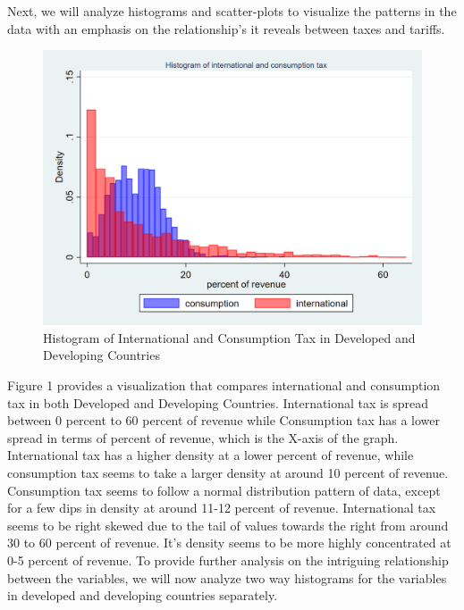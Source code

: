 \documentclass[12pt]{article}
\begin{document}
Next, we will analyze histograms and scatter-plots to visualize the patterns in the data with an emphasis on the relationship's it reveals between taxes and tariffs. 

\begin{figure}[h]
    \centering
    \includegraphics[width=0.8\linewidth]{Reproducibility_Package//research_outputs/twowayhistintcons.png}
    \caption{Histogram of International and Consumption Tax in Developed and Developing Countries}
    \label{fig:enter-label}
\end{figure}

Figure 1 provides a visualization that compares international and consumption tax in both Developed and Developing Countries. International tax is spread between 0 percent to 60 percent of revenue while Consumption tax has a lower spread in terms of percent of revenue, which is the X-axis of the graph. International tax has a higher density at a lower percent of revenue, while consumption tax seems to take a larger density at around 10 percent of revenue. Consumption tax seems to follow a normal distribution pattern of data, except for a few dips in density at around 11-12 percent of revenue. International tax seems to be right skewed due to the tail of values towards the right from around 30 to 60 percent of revenue. It's density seems to be more highly concentrated at 0-5 percent of revenue. To provide further analysis on the intriguing relationship between the variables, we will now analyze two way histograms for the variables in developed and developing countries separately. 
\end{document}
